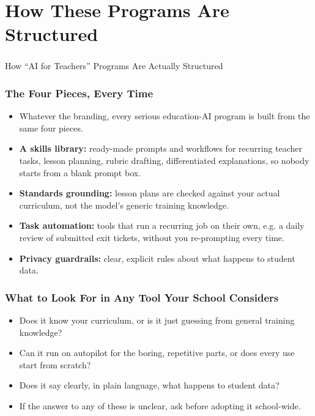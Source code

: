 \section[Programs]{How These Programs Are Structured}

\begin{frame}[fragile]\frametitle{}
\begin{center}
{\Large How ``AI for Teachers'' Programs Are Actually Structured}
\end{center}
\end{frame}

\begin{frame}[fragile]\frametitle{The Four Pieces, Every Time}
\begin{itemize}
\item Whatever the branding, every serious education-AI program is built from the same four pieces.
\item \textbf{A skills library:} ready-made prompts and workflows for recurring teacher tasks, lesson planning, rubric drafting, differentiated explanations, so nobody starts from a blank prompt box.
\item \textbf{Standards grounding:} lesson plans are checked against your actual curriculum, not the model's generic training knowledge.
\item \textbf{Task automation:} tools that run a recurring job on their own, e.g. a daily review of submitted exit tickets, without you re-prompting every time.
\item \textbf{Privacy guardrails:} clear, explicit rules about what happens to student data.
\end{itemize}
\end{frame}

\begin{frame}[fragile]\frametitle{What to Look For in Any Tool Your School Considers}
\begin{itemize}
\item Does it know your curriculum, or is it just guessing from general training knowledge?
\item Can it run on autopilot for the boring, repetitive parts, or does every use start from scratch?
\item Does it say clearly, in plain language, what happens to student data?
\item If the answer to any of these is unclear, ask before adopting it school-wide.
\end{itemize}
\end{frame}
